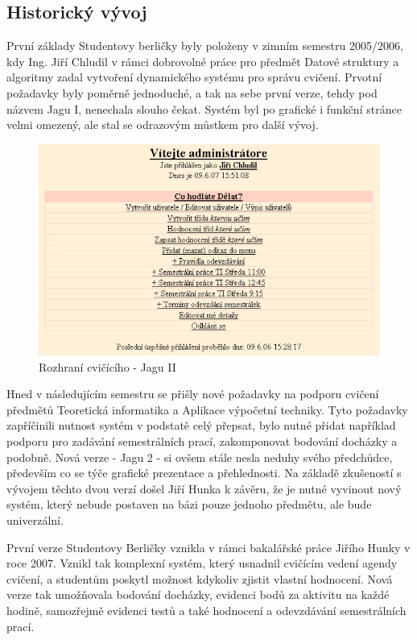 \documentclass[11pt,twoside,a4paper]{book}
\begin{document}
\subsection{Historický vývoj}
První základy Studentovy berličky byly položeny v zimním semestru 2005/2006, kdy Ing. Jiří Chludil v rámci dobrovolné práce pro předmět Datové struktury a algoritmy zadal vytvoření dynamického systému pro správu cvičení. Prvotní požadavky byly poměrně jednoduché, a tak na sebe první verze, tehdy pod názvem Jagu I, nenechala slouho čekat. Systém byl po grafické i funkční stránce velmi omezený, ale stal se odrazovým můstkem pro další vývoj.
\begin{figure}[h]
\begin{center}
\includegraphics[width=15cm]{figures/jaguI.png}
\caption{Rozhraní cvičícího - Jagu II}
\label{fig:jaguI}
\end{center}
\end{figure}

Hned v následujícím semestru se přišly nové požadavky na podporu cvičení předmětů Teoretická informatika a Aplikace výpočetní techniky. Tyto požadavky zapříčinili nutnost systém v podstatě celý přepsat, bylo nutné přidat například podporu pro zadávání semestrálních prací, zakomponovat bodování docházky a podobně. Nová verze - Jagu 2 - si ovšem stále nesla neduhy svého předchůdce, především co se týče grafické prezentace a přehlednosti. Na základě zkušeností s vývojem těchto dvou verzí došel Jiří Hunka k závěru, že je nutné vyvinout nový systém, který nebude postaven na bázi pouze jednoho předmětu, ale bude univerzální.

První  verze Studentovy Berličky vznikla v rámci bakalářské práce Jiřího Hunky v roce 2007. Vznikl tak komplexní systém, který usnadnil cvičícím vedení agendy cvičení, a studentům poskytl možnost kdykoliv zjistit vlastní hodnocení. Nová verze tak umožňovala bodování docházky, evidenci bodů za aktivitu na každé hodině, samozřejmě evidenci testů a také hodnocení a odevzdávání semestrálních prací.
\end{document}
